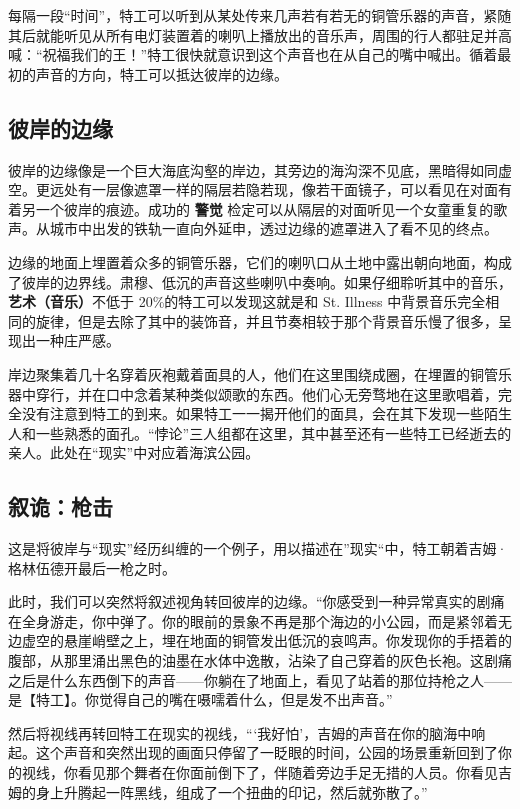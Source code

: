 每隔一段“时间”，特工可以听到从某处传来几声若有若无的铜管乐器的声音，紧随其后就能听见从所有电灯装置着的喇叭上播放出的音乐声，周围的行人都驻足并高喊：“祝福我们的王！”特工很快就意识到这个声音也在从自己的嘴中喊出。循着最初的声音的方向，特工可以抵达彼岸的边缘。

\subsection{彼岸的边缘}

彼岸的边缘像是一个巨大海底沟壑的岸边，其旁边的海沟深不见底，黑暗得如同虚空。更远处有一层像遮罩一样的隔层若隐若现，像若干面镜子，可以看见在对面有着另一个彼岸的痕迹。成功的 \textbf{警觉} 检定可以从隔层的对面听见一个女童重复的歌声。从城市中出发的铁轨一直向外延申，透过边缘的遮罩进入了看不见的终点。

边缘的地面上埋置着众多的铜管乐器，它们的喇叭口从土地中露出朝向地面，构成了彼岸的边界线。肃穆、低沉的声音这些喇叭中奏响。如果仔细聆听其中的音乐，\textbf{艺术（音乐）}不低于 20\%的特工可以发现这就是和 St. Illness 中背景音乐完全相同的旋律，但是去除了其中的装饰音，并且节奏相较于那个背景音乐慢了很多，呈现出一种庄严感。

岸边聚集着几十名穿着灰袍戴着面具的人，他们在这里围绕成圈，在埋置的铜管乐器中穿行，并在口中念着某种类似颂歌的东西。他们心无旁骛地在这里歌唱着，完全没有注意到特工的到来。如果特工一一揭开他们的面具，会在其下发现一些陌生人和一些熟悉的面孔。“悖论”三人组都在这里，其中甚至还有一些特工已经逝去的亲人。此处在“现实”中对应着海滨公园。

\subsection{叙诡：枪击}

这是将彼岸与“现实”经历纠缠的一个例子，用以描述在”现实“中，特工朝着吉姆·格林伍德开最后一枪之时。

此时，我们可以突然将叙述视角转回彼岸的边缘。“你感受到一种异常真实的剧痛在全身游走，你中弹了。你的眼前的景象不再是那个海边的小公园，而是紧邻着无边虚空的悬崖峭壁之上，埋在地面的铜管发出低沉的哀鸣声。你发现你的手捂着的腹部，从那里涌出黑色的油墨在水体中逸散，沾染了自己穿着的灰色长袍。这剧痛之后是什么东西倒下的声音——你躺在了地面上，看见了站着的那位持枪之人——是【特工】。你觉得自己的嘴在嗫嚅着什么，但是发不出声音。”

然后将视线再转回特工在现实的视线，“‘我好怕’，吉姆的声音在你的脑海中响起。这个声音和突然出现的画面只停留了一眨眼的时间，公园的场景重新回到了你的视线，你看见那个舞者在你面前倒下了，伴随着旁边手足无措的人员。你看见吉姆的身上升腾起一阵黑线，组成了一个扭曲的印记，然后就弥散了。”

